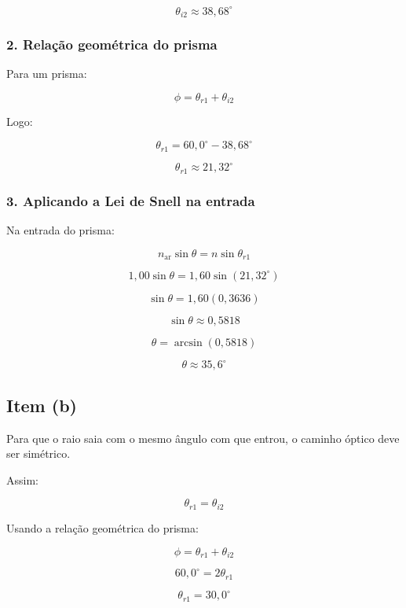 \documentclass[12pt,a4paper]{article}
\begin{document}
\[
\theta_{i2}
\approx 38,68^\circ
\]


\subsubsection*{2. Relação geométrica do prisma}

Para um prisma:

\[
\phi = \theta_{r1} + \theta_{i2}
\]

Logo:

\[
\theta_{r1}
=
60,0^\circ - 38,68^\circ
\]

\[
\theta_{r1}
\approx 21,32^\circ
\]


\subsubsection*{3. Aplicando a Lei de Snell na entrada}

Na entrada do prisma:

\[
n_{\text{ar}}\sin\theta
=
n\sin\theta_{r1}
\]

\[
1,00\sin\theta
=
1,60\sin(21,32^\circ)
\]

\[
\sin\theta
=
1,60(0,3636)
\]

\[
\sin\theta
\approx 0,5818
\]

\[
\theta
=
\arcsin(0,5818)
\]

\[
\theta
\approx 35,6^\circ
\]


\subsection*{ Item (b)}

Para que o raio saia com o mesmo ângulo com que entrou, o caminho óptico deve ser simétrico.

Assim:

\[
\theta_{r1} = \theta_{i2}
\]

Usando a relação geométrica do prisma:

\[
\phi = \theta_{r1} + \theta_{i2}
\]

\[
60,0^\circ = 2\theta_{r1}
\]

\[
\theta_{r1}
=
30,0^\circ
\]

\end{document}
